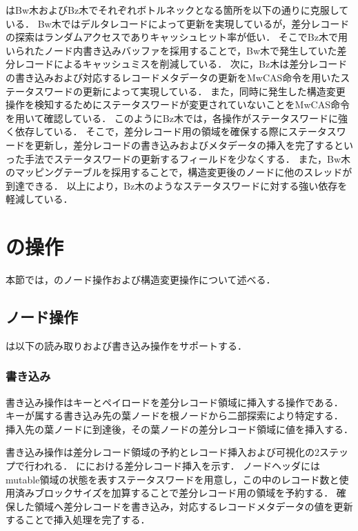 \Bctree{}はBw木およびBz木でそれぞれボトルネックとなる箇所を以下の通りに克服している．
Bw木ではデルタレコードによって更新を実現しているが，差分レコードの探索はランダムアクセスでありキャッシュヒット率が低い．
そこでBz木で用いられたノード内書き込みバッファを採用することで，Bw木で発生していた差分レコードによるキャッシュミスを削減している．
次に，Bz木は差分レコードの書き込みおよび対応するレコードメタデータの更新をMwCAS命令を用いたステータスワードの更新によって実現している．
また，同時に発生した構造変更操作を検知するためにステータスワードが変更されていないことをMwCAS命令を用いて確認している．
このようにBz木では，各操作がステータスワードに強く依存している．
そこで，差分レコード用の領域を確保する際にステータスワードを更新し，差分レコードの書き込みおよびメタデータの挿入を完了するといった手法でステータスワードの更新するフィールドを少なくする．
また，Bw木のマッピングテーブルを採用することで，構造変更後のノードに他のスレッドが到達できる．
以上により，Bz木のようなステータスワードに対する強い依存を軽減している．

\section{\Bctree{}の操作}
\label{sec:bc_tree_operation}

本節では，\Bctree{}のノード操作および構造変更操作について述べる．

\subsection{ノード操作}

\Bctree{}は以下の読み取りおよび書き込み操作をサポートする．

\subsubsection{書き込み}

書き込み操作はキーとペイロードを差分レコード領域に挿入する操作である．
キーが属する書き込み先の葉ノードを根ノードから二部探索により特定する．
挿入先の葉ノードに到達後，その葉ノードの差分レコード領域に値を挿入する．

書き込み操作は差分レコード領域の予約とレコード挿入および可視化の2ステップで行われる．
\Fig{\ref{fig:bc_tree_insertion}}に\Bctree{}における差分レコード挿入を示す．
ノードヘッダにはmutable領域の状態を表すステータスワードを用意し，この中のレコード数と使用済みブロックサイズを加算することで差分レコード用の領域を予約する．
確保した領域へ差分レコードを書き込み，対応するレコードメタデータの値を更新することで挿入処理を完了する．

